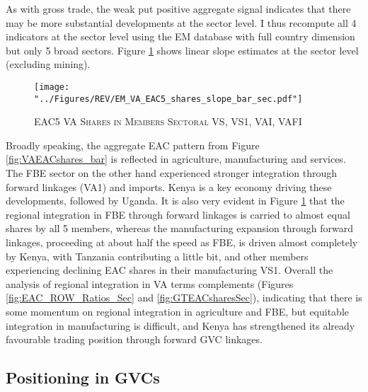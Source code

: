 \documentclass[a4paper]{article}
\begin{document}
As with gross trade, the weak put positive aggregate signal indicates that there may be more substantial developments at the sector level. I thus recompute all 4 indicators at the sector level using the EM database with full country dimension but only 5 broad sectors. Figure \ref{fig:VAEACshares_bar_sec} shows linear slope estimates at the sector level (excluding mining). 
%
\begin{figure}[h!] \vspace{-3mm}
\centering
\caption{\label{fig:VAEACshares_bar_sec}\textsc{EAC5 VA Shares in Members Sectoral VS, VS1, VAI, VAFI}}
\texttt{[image: "../Figures/REV/EM\_VA\_EAC5\_shares\_slope\_bar\_sec.pdf"]} \\ %
 \vspace{-7mm}
\end{figure}
\FloatBarrier
%
Broadly speaking, the aggregate EAC pattern from Figure \ref{fig:VAEACshares_bar} is reflected in agriculture, manufacturing and services. The FBE sector on the other hand experienced stronger integration through forward linkages (VA1) and imports. Kenya is a key economy driving these developments, followed by Uganda. It is also very evident in Figure \ref{fig:VAEACshares_bar_sec} that the regional integration in FBE through forward linkages is carried to almost equal shares by all 5 members, whereas the manufacturing expansion through forward linkages, proceeding at about half the speed as FBE, is driven almost completely by Kenya, with Tanzania contributing a little bit, and other members experiencing declining EAC shares in their manufacturing VS1. Overall the analysis of regional integration in VA terms complements (Figures \ref{fig:EAC_ROW_Ratios_Sec} and \ref{fig:GTEACsharesSec}), indicating that there is some momentum on regional integration in agriculture and FBE, but equitable integration in manufacturing is difficult, and Kenya has strengthened its already favourable trading position through forward GVC linkages. 
\subsection{Positioning in GVCs}
\end{document}
